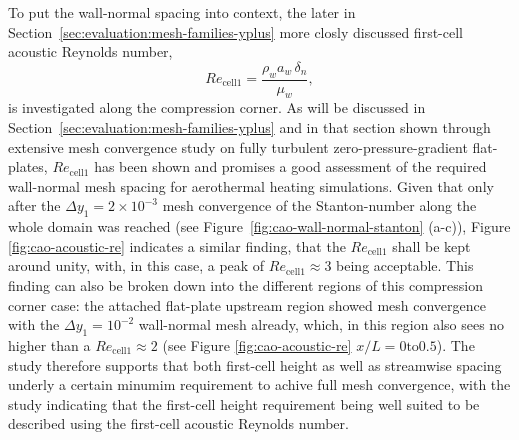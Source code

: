 To put the wall-normal spacing into context, the later in Section~\ref{sec:evaluation:mesh-families-yplus} more closly discussed first-cell acoustic Reynolds number,
\begin{equation}
    Re_{\mathrm{cell1}}=
    \frac{\rho_w a_w\,\delta_n}{\mu_w},
    \label{eq:cao-first-cell-acoustic-re}
\end{equation}
is investigated along the compression corner. As will be discussed in Section~\ref{sec:evaluation:mesh-families-yplus} and in that section shown through extensive mesh convergence study on fully turbulent zero-pressure-gradient flat-plates, \(Re_{\mathrm{cell1}}\) has been shown and promises a good assessment of the required wall-normal mesh spacing for aerothermal heating simulations. Given that only after the \(\Delta y_1 = 2\times10^{-3}\) mesh convergence of the Stanton-number along the whole domain was reached (see Figure~\ref{fig:cao-wall-normal-stanton} (a-c)), Figure \ref{fig:cao-acoustic-re} indicates a similar finding, that the \(Re_{\mathrm{cell1}}\) shall be kept around unity, with, in this case, a peak of \(Re_{\mathrm{cell1}}\approx3\) being acceptable. This finding can also be broken down into the different regions of this compression corner case: the attached flat-plate upstream region showed mesh convergence with the \(\Delta y_1 =10^{-2}\) wall-normal mesh already, which, in this region also sees no higher than a \(Re_{\mathrm{cell1}}\approx2\) (see Figure \ref{fig:cao-acoustic-re} \(x/L=0 \mathrm{to} 0.5\)). The study therefore supports that both first-cell height as well as streamwise spacing underly a certain minumim requirement to achive full mesh convergence, with the study indicating that the first-cell height requirement being well suited to be described using the first-cell acoustic Reynolds number.

